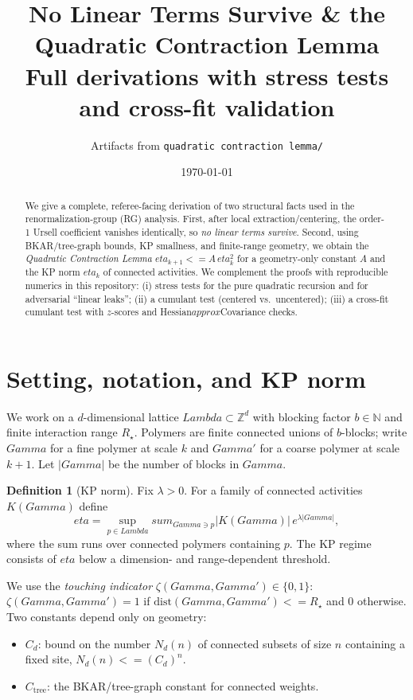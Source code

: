\documentclass[11pt]{article}
\title{\textbf{No Linear Terms Survive \& the Quadratic Contraction Lemma}\\
\large Full derivations with stress tests and cross-fit validation}
\author{Artifacts from \texttt{quadratic contraction lemma/}}
\date{\today}
\def\;{ }%
\def\eta{eta}%
\def\Gamma{Gamma}%
\def\Lambda{Lambda}%
\def\sum{sum}%
\def\le{<=}%
\def\approx{approx}%
\theoremstyle{definition}
\newtheorem{defn}[theorem]{Definition}
\theoremstyle{remark}
\newcommand{\1}{\mathbbm{1}}
\newcommand{\abs}[1]{\left\lvert #1 \right\rvert}
\newcommand{\Z}{\mathbb{Z}}
\begin{document}
\maketitle

\begin{abstract}
We give a complete, referee-facing derivation of two structural facts used in the renormalization-group (RG) analysis.
First, after local extraction/centering, the order-1 Ursell coefficient vanishes identically, so \emph{no linear terms survive}.
Second, using BKAR/tree-graph bounds, KP smallness, and finite-range geometry, we obtain the \emph{Quadratic Contraction Lemma}
\(\eta_{k+1}\le A\,\eta_k^2\) for a geometry-only constant \(A\) and the KP norm \(\eta_k\) of connected activities.
We complement the proofs with reproducible numerics in this repository: (i) stress tests for the pure quadratic recursion and for adversarial ``linear leaks''; (ii) a cumulant test (centered vs.\ uncentered); (iii) a cross-fit cumulant test with $z$-scores and Hessian$\approx$Covariance checks.
\end{abstract}

\tableofcontents

\section{Setting, notation, and KP norm}
\label{sec:setting}
We work on a $d$-dimensional lattice $\Lambda\subset\Z^d$ with blocking factor $b\in\mathbb{N}$ and finite interaction range $R_\star$.
Polymers are finite connected unions of $b$-blocks; write $\Gamma$ for a fine polymer at scale $k$ and $\Gamma'$ for a coarse polymer at scale $k{+}1$.
Let $\abs{\Gamma}$ be the number of blocks in $\Gamma$.

\begin{defn}[KP norm]
Fix $\lambda>0$. For a family of connected activities $K(\Gamma)$ define
\[
\eta\;=\;\sup_{p\in \Lambda}\;
\sum_{\Gamma\ni p}\abs{K(\Gamma)}\,e^{\lambda\abs{\Gamma}},
\]
where the sum runs over connected polymers containing $p$.
The KP regime consists of $\eta$ below a dimension- and range-dependent threshold.
\end{defn}

We use the \emph{touching indicator} $\zeta(\Gamma,\Gamma')\in\{0,1\}$: $\zeta(\Gamma,\Gamma')=1$ if $\mathrm{dist}(\Gamma,\Gamma')\le R_\star$ and $0$ otherwise.
Two constants depend only on geometry:
\begin{itemize}[leftmargin=2.2em]
\item $C_d$: bound on the number $N_d(n)$ of connected subsets of size $n$ containing a fixed site, $N_d(n)\le (C_d)^n$.
\item $C_{\mathrm{tree}}$: the BKAR/tree-graph constant for connected weights.
\end{itemize}
\end{document}
